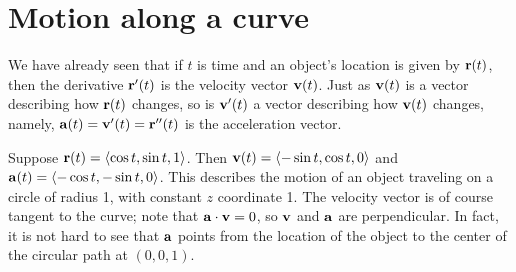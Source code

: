 \section{Motion along a curve}{}{}

We have already seen that if $t$ is time and an object's location is
given by ${\bf r}(t)$, then the derivative ${\bf r}'(t)$ is the
velocity vector ${\bf v}(t)$.
Just as ${\bf v}(t)$ is a vector describing how ${\bf r}(t)$ changes,
so is ${\bf v}'(t)$ a vector describing how ${\bf v}(t)$ changes,
namely, ${\bf a}(t)={\bf v}'(t)={\bf r}''(t)$ is the 
{\dfont acceleration vector}.

\begin{example} Suppose ${\bf r}(t)=\langle \cos t,\sin t,1\rangle$. Then
${\bf v}(t)=\langle -\sin t,\cos t,0\rangle$ and 
${\bf a}(t)=\langle -\cos t,-\sin t,0\rangle$. This describes the
motion of an object traveling on a circle of radius 1, with constant
$z$ coordinate 1. The velocity vector is of course tangent to the
curve; note that ${\bf a}\cdot{\bf v}=0$, so ${\bf v}$ and ${\bf a}$
are perpendicular. In fact, it is not hard to see that ${\bf a}$
points from the location of the object to the center of the circular
path at $(0,0,1)$.
\end{example}

